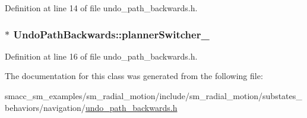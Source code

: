 Definition at line 14 of file undo\+\_\+path\+\_\+backwards.\+h.

\subsubsection[{\texorpdfstring{planner\+Switcher\+\_\+}{plannerSwitcher_}}]{$\ast$ Undo\+Path\+Backwards\+::planner\+Switcher\+\_\+\hspace{0.3cm}{\ttfamily [private]}}\hypertarget{classUndoPathBackwards_a88c201f6b358634091afec44002e5f28}{}\label{classUndoPathBackwards_a88c201f6b358634091afec44002e5f28}


Definition at line 16 of file undo\+\_\+path\+\_\+backwards.\+h.



The documentation for this class was generated from the following file\+:\begin{DoxyCompactItemize}
\item 
smacc\+\_\+sm\+\_\+examples/sm\+\_\+radial\+\_\+motion/include/sm\+\_\+radial\+\_\+motion/substates\+\_\+behaviors/navigation/\hyperlink{undo__path__backwards_8h}{undo\+\_\+path\+\_\+backwards.\+h}\end{DoxyCompactItemize}
